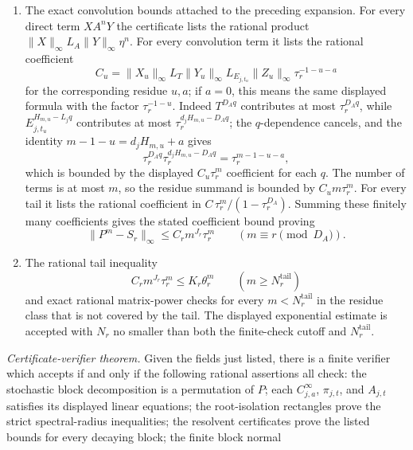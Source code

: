 \begin{theorem}
\begin{enumerate}[label=\textup{(\roman*)}]
    residue list is
    \[
      \sum_{q=0}^{Q(m,u)}
        X_{u}T^{D_Aq}Y_{u}E_{j,t_u}^{H_{m,u}-L_jq}Z_{u},
    \]
    with all matrices \(X_u,Y_u,Z_u\) rational. This is the normal form
    for every convolution term.
    \item The exact convolution bounds attached to the preceding
    expansion. For every direct term \(X A^nY\) the certificate lists
    the rational product
    \(\|X\|_\infty L_A\|Y\|_\infty\eta^n\). For every convolution term
    it lists the rational coefficient
    \[
      C_u=\|X_u\|_\infty L_T\|Y_u\|_\infty
        L_{E_{j,t_u}}\|Z_u\|_\infty\tau_r^{-1-u-a}
    \]
    for the corresponding residue \(u,a\); if \(a=0\), this means the
    same displayed formula with the factor \(\tau_r^{-1-u}\). Indeed
    \(T^{D_Aq}\) contributes at most \(\tau_r^{D_Aq}\), while
    \(E_{j,t_u}^{H_{m,u}-L_jq}\) contributes at most
    \(\tau_r^{d_jH_{m,u}-D_Aq}\); the \(q\)-dependence cancels, and the
    identity \(m-1-u=d_jH_{m,u}+a\) gives
    \[
      \tau_r^{D_Aq}\tau_r^{d_jH_{m,u}-D_Aq}
      =\tau_r^{m-1-u-a},
    \]
    which is bounded by the displayed \(C_u\tau_r^m\) coefficient for
    each \(q\). The number of terms is at most \(m\),
    so the residue summand is bounded by \(C_um\tau_r^m\). For every
    tail it lists the
    rational coefficient in
    \(C\,\tau_r^m/(1-\tau_r^{D_A})\). Summing these finitely many
    coefficients gives the stated coefficient bound
    proving
    \[
      \|P^m-S_r\|_\infty\le C_rm^{J_r}\tau_r^m
      \qquad(m\equiv r\pmod {D_A}).
    \]
    \item The rational tail inequality
    \[
      C_rm^{J_r}\tau_r^m\le K_r\theta_r^m
      \qquad(m\ge N_r^{\mathrm{tail}})
    \]
    and exact rational matrix-power checks for every
    \(m<N_r^{\mathrm{tail}}\) in the residue class that is not covered
    by the tail. The displayed exponential estimate is accepted with
    \(N_r\) no smaller than both the finite-check cutoff and
    \(N_r^{\mathrm{tail}}\).
  \end{enumerate}
  \smallskip
  \noindent\textit{Certificate-verifier theorem.}
  Given the fields just listed, there is a finite verifier which accepts
  if and only if the following rational assertions all check:
  the stochastic block decomposition is a permutation of \(P\); each
  \(C_{j,a}^{\infty}\), \(\pi_{j,t}\), and \(A_{j,t}\) satisfies its
  displayed linear equations; the root-isolation rectangles prove the
  strict spectral-radius inequalities; the resolvent certificates prove
  the listed bounds for every decaying block; the finite block normal

\end{theorem}

